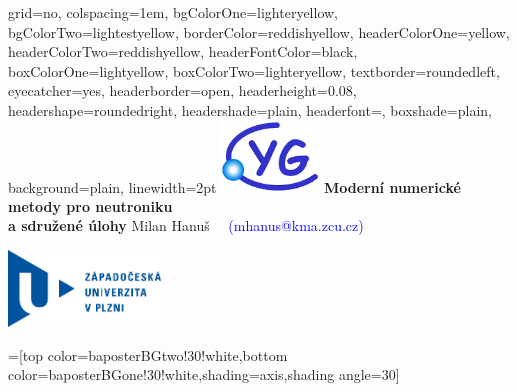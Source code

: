 \documentclass[margin=3cm,mikulas,portrait,final]{myposter}
\begin{document}
\newlength{\leftimgwidth}
\begin{poster}%
  {
    grid=no,
    colspacing=1em,
    bgColorOne=lighteryellow,
    bgColorTwo=lightestyellow,
    borderColor=reddishyellow,
    headerColorOne=yellow,
    headerColorTwo=reddishyellow,
    headerFontColor=black,
    boxColorOne=lightyellow,
    boxColorTwo=lighteryellow,
    textborder=roundedleft,
    eyecatcher=yes,
    headerborder=open,
    headerheight=0.08\textheight,
    headershape=roundedright,
    headershade=plain,
    headerfont=\Large\textsf, %
    boxshade=plain,
    background=plain,
    linewidth=2pt
  }
  {\includegraphics[width=7em]{cyg}}%
  {
    \huge
    \sf %
    \textbf{Moderní numerické metody pro neutroniku \\[.33ex] a sdružené úlohy}
  }
  {
    \vspace{1.5ex}
    \sf %
    Milan Hanuš ~~\textcolor{Blue}{(mhanus@kma.zcu.cz)}
  }
  {
    \begin{minipage}{11em}
      \hfill
      \includegraphics[width=11em]{zcu.pdf}
    \end{minipage}
  }

  =[top color=baposterBGtwo!30!white,bottom color=baposterBGone!30!white,shading=axis,shading angle=30]

     \setlength{\leftimgwidth}{0.78em+8.0em}

    \newcommand{\colouredcircle}[1]{%
      \tikz{\useasboundingbox (-0.2em,-0.32em) rectangle(0.2em,0.32em); \draw[draw=black,fill=bgColorOne!80!black!#1!white,line width=0.03em] (0,0) circle(0.18em);}}
    

\end{poster}
\end{document}
